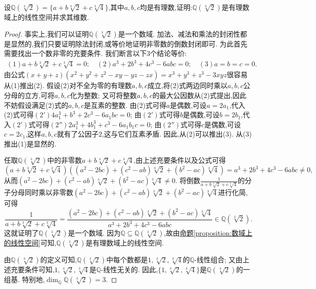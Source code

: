 \documentclass[../../main.tex]{subfiles}%
\begin{document}
\begin{example}
设\(\mathbb{Q}(\sqrt[3]{2})=\{a + b\sqrt[3]{2}+c\sqrt[3]{4}\}\),其中\(a,b,c\)均是有理数,证明:\(\mathbb{Q}(\sqrt[3]{2})\)是有理数域上的线性空间并求其维数.
\end{example}
\begin{proof}
事实上,我们可以证明\(\mathbb{Q}(\sqrt[3]{2})\)是一个数域. 加法、减法和乘法的封闭性都是显然的,我们只要证明除法封闭,或等价地证明非零数的倒数封闭即可. 为此首先需要找出一个数非零的充要条件. 我们断言以下3个结论等价:
\begin{gather*}
(1) a + b\sqrt[3]{2}+c\sqrt[3]{4}=0;\quad(2) a^3 + 2b^3+4c^3-6abc = 0;\quad (3) a = b = c = 0.
\end{gather*}
由公式\((x + y + z)(x^2 + y^2+z^2-xy - yz - zx)=x^3 + y^3+z^3-3xyz\)很容易从(1)推出(2). 假设(2)对不全为零的有理数\(a,b,c\)成立,将(2)式两边同时乘以\(a,b,c\)公分母的立方,可将\(a,b,c\)化为整数; 又可将整数\(a,b,c\)的最大公因数从(2)式提出,因此不妨假设满足(2)式的\(a,b,c\)是互素的整数. 由(2)式可得\(a\)是偶数,可设\(a = 2a_1\),代入(2)式可得\((2')4a_1^3 + b^3+2c^3-6a_1bc = 0\); 由\((2')\)式可得\(b\)是偶数,可设\(b = 2b_1\),代入\((2')\)式可得\((2'')2a_1^3 + 4b_1^3+c^3-6a_1b_1c = 0\); 由\((2'')\)式可得\(c\)是偶数,可设\(c = 2c_1\),这样\(a,b,c\)就有了公因子\(2\),这与它们互素矛盾. 因此,从(2)可以推出(3). 从(3)推出(1)是显然的.

任取\(\mathbb{Q}(\sqrt[3]{2})\)中的非零数\(a + b\sqrt[3]{2}+c\sqrt[3]{4}\),由上述充要条件以及公式可得
\[
(a + b\sqrt[3]{2}+c\sqrt[3]{4})((a^2 - 2bc)+(c^2 - ab)\sqrt[3]{2}+(b^2 - ac)\sqrt[3]{4})=a^3 + 2b^3+4c^3-6abc\neq0,
\]
从而\((a^2 - 2bc)+(c^2 - ab)\sqrt[3]{2}+(b^2 - ac)\sqrt[3]{4}\neq0\). 将倒数\(\frac{1}{a + b\sqrt[3]{2}+c\sqrt[3]{4}}\)的分子分母同时乘以非零数\((a^2 - 2bc)+(c^2 - ab)\sqrt[3]{2}+(b^2 - ac)\sqrt[3]{4}\)进行化简,可得
\[
\frac{1}{a + b\sqrt[3]{2}+c\sqrt[3]{4}}=\frac{(a^2 - 2bc)+(c^2 - ab)\sqrt[3]{2}+(b^2 - ac)\sqrt[3]{4}}{a^3 + 2b^3+4c^3-6abc}\in\mathbb{Q}(\sqrt[3]{2}).
\]
这就证明了\(\mathbb{Q}(\sqrt[3]{2})\)是一个数域. 因为\(\mathbb{Q}\subseteq\mathbb{Q}(\sqrt[3]{2})\),故由\hyperref[proposition:数域上的线性空间]{命题\ref{proposition:数域上的线性空间}}可知,\(\mathbb{Q}(\sqrt[3]{2})\)是有理数域上的线性空间.

由\(\mathbb{Q}(\sqrt[3]{2})\)的定义可知,\(\mathbb{Q}(\sqrt[3]{2})\)中每个数都是\(1,\sqrt[3]{2},\sqrt[3]{4}\)的\(\mathbb{Q}\)-线性组合; 又由上述充要条件可知,\(1,\sqrt[3]{2},\sqrt[3]{4}\)是\(\mathbb{Q}\)-线性无关的. 因此,\(\{1,\sqrt[3]{2},\sqrt[3]{4}\}\)是\(\mathbb{Q}(\sqrt[3]{2})\)的一组基. 特别地,\(\dim_{\mathbb{Q}}\mathbb{Q}(\sqrt[3]{2}) = 3\).
\end{proof}
\end{document}
